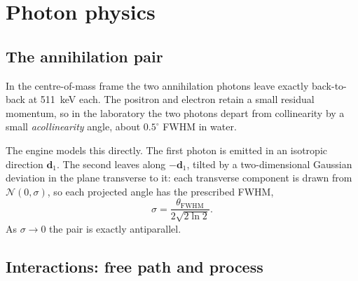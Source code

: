 \documentclass[11pt]{article}
\begin{document}
\section{Photon physics}
\label{sec:physics}

\subsection{The annihilation pair}

In the centre-of-mass frame the two annihilation photons leave exactly back-to-back at
\SI{511}{keV} each. The positron and electron retain a small residual momentum, so in the
laboratory the two photons depart from collinearity by a small \emph{acollinearity} angle, about
$0.5^{\circ}$ FWHM in water.

The engine models this directly. The first photon is emitted in an isotropic direction
$\mathbf{d}_1$. The second leaves along $-\mathbf{d}_1$, tilted by a two-dimensional Gaussian
deviation in the plane transverse to it: each transverse component is drawn from
$\mathcal{N}(0,\sigma)$, so each projected angle has the prescribed FWHM,
\begin{equation}
  \sigma = \frac{\theta_{\mathrm{FWHM}}}{2\sqrt{2\ln 2}}.
\end{equation}
As $\sigma\!\to\!0$ the pair is exactly antiparallel.

\subsection{Interactions: free path and process}
\end{document}
